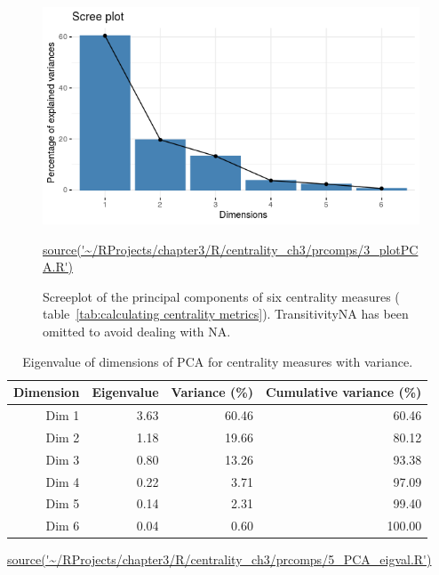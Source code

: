 \begin{figure}
    \centering
    \includegraphics[width=\textwidth]{images/chapter3/centrality_pca_factoextra/Rplot_screeplot.png}
    \caption{Screeplot of the principal components of six centrality measures ( table~\ref{tab:calculating centrality metrics}). TransitivityNA has been omitted to avoid dealing with NA.} \tiny\url{source('~/RProjects/chapter3/R/centrality_ch3/prcomps/3_plotPCA.R')}
    \label{fig:PCA_scree}
\end{figure}

\begin{table}[ht]
\centering
\begin{tabular}{rrrr}
  \toprule
Dimension & Eigenvalue & Variance (\%) & Cumulative variance (\%) \\ 
  \midrule
Dim 1 & 3.63 & 60.46 & 60.46 \\ 
  Dim 2 & 1.18 & 19.66 & 80.12 \\ 
  Dim 3 & 0.80 & 13.26 & 93.38 \\ 
  Dim 4 & 0.22 & 3.71 & 97.09 \\ 
  Dim 5 & 0.14 & 2.31 & 99.40 \\ 
  Dim 6 & 0.04 & 0.60 & 100.00 \\ 
   \bottomrule
\end{tabular}
\caption[Variance explained by PCA components of centrality measures]{Eigenvalue of dimensions of PCA for centrality measures with variance.}
\tiny\url{source('~/RProjects/chapter3/R/centrality_ch3/prcomps/5_PCA_eigval.R')}
\label{tab:Eigenvalue of dimensions of PCA for centrality measures with variance}
\end{table}


